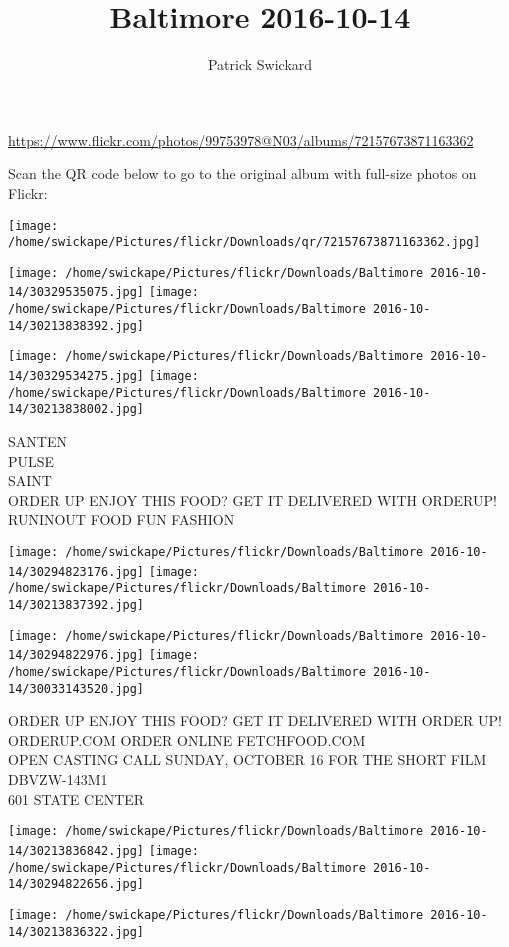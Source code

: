 \documentclass[10pt,letterpaper]{article}
\title{Baltimore 2016-10-14}
\author{Patrick Swickard}
\date{}
\begin{document}
\maketitle

\url{https://www.flickr.com/photos/99753978@N03/albums/72157673871163362}

Scan the QR code below to go to the original album with full-size photos on Flickr:

\texttt{[image: /home/swickape/Pictures/flickr/Downloads/qr/72157673871163362.jpg]}
\pagebreak

\texttt{[image: /home/swickape/Pictures/flickr/Downloads/Baltimore 2016-10-14/30329535075.jpg]}
\texttt{[image: /home/swickape/Pictures/flickr/Downloads/Baltimore 2016-10-14/30213838392.jpg]}

\texttt{[image: /home/swickape/Pictures/flickr/Downloads/Baltimore 2016-10-14/30329534275.jpg]}
\texttt{[image: /home/swickape/Pictures/flickr/Downloads/Baltimore 2016-10-14/30213838002.jpg]}

SANTEN\\
PULSE\\
SAINT\\
ORDER UP ENJOY THIS FOOD?  GET IT DELIVERED WITH ORDERUP!  RUNINOUT FOOD FUN FASHION
\pagebreak

\texttt{[image: /home/swickape/Pictures/flickr/Downloads/Baltimore 2016-10-14/30294823176.jpg]}
\texttt{[image: /home/swickape/Pictures/flickr/Downloads/Baltimore 2016-10-14/30213837392.jpg]}

\texttt{[image: /home/swickape/Pictures/flickr/Downloads/Baltimore 2016-10-14/30294822976.jpg]}
\texttt{[image: /home/swickape/Pictures/flickr/Downloads/Baltimore 2016-10-14/30033143520.jpg]}

ORDER UP ENJOY THIS FOOD?  GET IT DELIVERED WITH ORDER UP!  ORDERUP.COM  ORDER ONLINE FETCHFOOD.COM\\
OPEN CASTING CALL SUNDAY, OCTOBER 16 FOR THE SHORT FILM\\
DBVZW{-}143M1\\
601 STATE CENTER
\pagebreak

\texttt{[image: /home/swickape/Pictures/flickr/Downloads/Baltimore 2016-10-14/30213836842.jpg]}
\texttt{[image: /home/swickape/Pictures/flickr/Downloads/Baltimore 2016-10-14/30294822656.jpg]}

\vspace{0.25in}
\texttt{[image: /home/swickape/Pictures/flickr/Downloads/Baltimore 2016-10-14/30213836322.jpg]}
\end{document}
